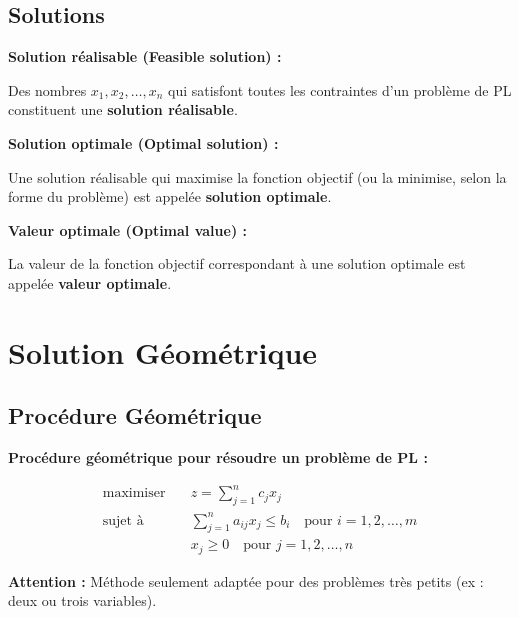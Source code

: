\documentclass[12pt,a4paper]{article}
\begin{document}
\subsection{Solutions}

\begin{definition}
\textbf{Solution réalisable (Feasible solution) :}

Des nombres $x_1, x_2, \ldots, x_n$ qui satisfont toutes les contraintes d'un problème de PL constituent une \textcolor{defvert}{\textbf{solution réalisable}}.
\end{definition}

\begin{definition}
\textbf{Solution optimale (Optimal solution) :}

Une solution réalisable qui maximise la fonction objectif (ou la minimise, selon la forme du problème) est appelée \textcolor{importantrouge}{\textbf{solution optimale}}.
\end{definition}

\begin{definition}
\textbf{Valeur optimale (Optimal value) :}

La valeur de la fonction objectif correspondant à une solution optimale est appelée \textcolor{titrebleu}{\textbf{valeur optimale}}.
\end{definition}

\newpage
\section{Solution Géométrique}

\subsection{Procédure Géométrique}

\begin{important}
\textbf{Procédure géométrique pour résoudre un problème de PL :}

\begin{align*}
\text{maximiser} \quad & z = \sum_{j=1}^{n} c_jx_j\\
\text{sujet à} \quad & \sum_{j=1}^{n} a_{ij}x_j \leq b_i \quad \text{pour } i = 1, 2, \ldots, m\\
& x_j \geq 0 \quad \text{pour } j = 1, 2, \ldots, n
\end{align*}

\textcolor{importantrouge}{\textbf{Attention :}} Méthode seulement adaptée pour des problèmes très petits (ex : deux ou trois variables).
\end{important}
\end{document}
